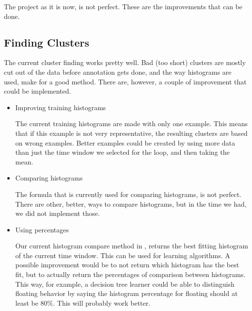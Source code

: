 The project as it is now, is not perfect. These are the improvements that can be done.
\subsection{Finding Clusters} 
The current cluster finding works pretty well. Bad (too short) clusters are
mostly cut out of the data before annotation gets done, and the way histograms
are used, make for a good method. There are, however, a couple of improvement
that could be implemented.

\begin{itemize}
 \item Improving training histograms

    The current training histograms are made with only one example. This means
    that if this example is not very representative, the resulting clusters are
    based on wrong examples. Better examples could be created by using more data
    than just the time window we selected for the loop, and then taking the
    mean.
 \item Comparing histograms

    The formula that is currently used for comparing histograms, is not perfect.
    There are other, better, ways to compare histograms, but in the time we had,
    we did not implement those.

 \item Using percentages
    
    Our current histogram compare method in \matlab, returns the best fitting
    histogram of the current time window. This can be 
    used for learning algorithms. A possible improvement would be to not return
    which histogram has the best fit, but to actually return the percentages of
    comparison between histograms. This way, for example, a decision tree
    learner could be able to distinguish floating behavior by saying the
    histogram percentage for floating should at least be 80\%. This will
    probably work better.
 
\end{itemize}
    
